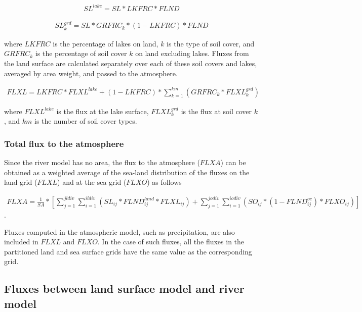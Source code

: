 \begin{eqnarray} SL^{lake}=SL * LKFRC * FLND \end{eqnarray}

\begin{eqnarray} SL^{grd}_k = SL * GRFRC_k * (1-LKFRC) * FLND \end{eqnarray}

where \(LKFRC\) is the percentage of lakes on land, \(k\) is the type of
soil cover, and \(GRFRC_k\) is the percentage of soil cover \(k\) on
land excluding lakes. Fluxes from the land surface are calculated
separately over each of these soil covers and lakes, averaged by area
weight, and passed to the atmosphere.

\begin{eqnarray} FLXL = LKFRC * FLXL^{lake} + (1-LKFRC) * \sum_{k=1}^{km} (GRFRC_k * FLXL_k^{grd}) \end{eqnarray}

where \(FLXL^{lake}\) is the flux at the lake surface,
\(FLXL_{k}^{grd}\) is the flux at soil cover \(k\), and \(km\) is the
number of soil cover types.

\hypertarget{total-flux-to-the-atmosphere}{%
\subsubsection{Total flux to the
atmosphere}\label{total-flux-to-the-atmosphere}}

Since the river model has no area, the flux to the atmosphere (\(FLXA\))
can be obtained as a weighted average of the sea-land distribution of
the fluxes on the land grid (\(FLXL\)) and at the sea grid (\(FLXO\)) as
follows

\begin{eqnarray} FLXA = \frac{1}{SA} * [ \sum _ {j=1}^{jldiv} \sum_{i=1}^{ildiv}(SL _ {ij} * FLND^{land} _ {ij}*FLXL_{ij}) + \sum _ {j=1}^{jodiv}\sum _ {i=1}^{iodiv }(SO _ {ij} * (1-FLND^{oc} _ {ij}) * FLXO _ {ij})] \end{eqnarray}.

Fluxes computed in the atmospheric model, such as precipitation, are
also included in \(FLXL\) and \(FLXO\). In the case of such fluxes, all
the fluxes in the partitioned land and sea surface grids have the same
value as the corresponding grid.

\hypertarget{fluxes-between-land-surface-model-and-river-model}{%
\subsection{Fluxes between land surface model and river
model}\label{fluxes-between-land-surface-model-and-river-model}}

